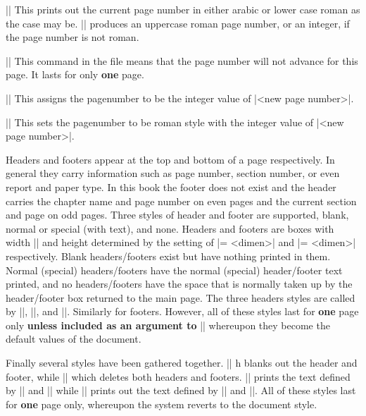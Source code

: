 \beginblockmode
\mbr
\pla\@|\folio|
\nbr
This prints out the current page number in either arabic or lower case roman
as the case may be. \@|\uppercase\folio| produces an uppercase roman page
number, or an integer, if the page number is not roman.

\mbr
\ext\@|\nopagenumberadvance|
\nbr
This command in the file means that the page number will not advance for this
page. It lasts for only {\bf one} page.

\mbr
\ext\@||
\nbr
This assigns the pagenumber to be the integer value of |<new page number>|.

\mbr
\ext\@||
\nbr
This sets the  pagenumber to be roman style with 
the integer value of |<new page number>|.
\endblockmode

Headers and footers appear at the top and bottom of a page respectively. In
general they carry information such as page number, section number, or even
report and paper type. In this book the footer does not exist and the header
carries the chapter name and page number on even pages and the current
section and page on odd pages. Three styles of header and footer are
supported, blank, normal or special (with text), and none. 
Headers and footers are boxes
with width |\houterpagesize| and height determined by the setting of
\@|\vheadersize = <dimen>| and \@|\vfootersize = <dimen>| respectively. 
Blank headers/footers exist
but have nothing printed in them. Normal (special) 
headers/footers have the normal (special)
header/footer text printed, and no headers/footers have the space that is
normally taken up by the header/footer box returned to the main page. The
three headers styles are called by |\blankheaderstyle|, |\normalheaderstyle|,
and |\noheaderstyle|. Similarly for footers. However, all of these styles
last for {\bf one} page only {\bf unless included as an argument to} 
\@|\documentstyle| whereupon they become the default values of the document.

Finally several
styles have been gathered together.  |\titlepagestyle| h blanks out
the header and footer, while  |\fullpagestyle| which deletes both headers and
footers. |\normalpagestyle| prints the text defined by |\headertext| and
|\footertext| while |\specialpagestyle| prints out the text defined by
|\specialheadertext| and |\specialfootertext|.  All of these styles last for
{\bf one} page only, whereupon the system reverts to the document style.
 
